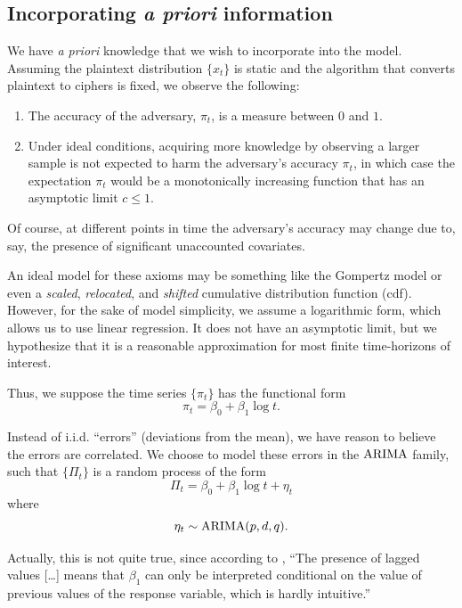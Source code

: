 \documentclass[final,
  11pt,
]{article}
\begin{document}
\hypertarget{incorporating-information}{%
\subsection{\texorpdfstring{Incorporating \emph{a priori}
information}{Incorporating  information}}\label{incorporating-information}}

We have \emph{a priori} knowledge that we wish to incorporate into the
model. Assuming the plaintext distribution \(\{x_t\}\) is static and the
algorithm that converts plaintext to ciphers is fixed, we observe the
following:

\begin{enumerate}
\item The accuracy of the adversary, $\pi_t$, is a measure between $0$ and $1$.
\item Under ideal conditions, acquiring more knowledge by observing a larger
sample is not expected to harm the adversary's accuracy $\pi_t$, in which case
the expectation $\pi_t$ would be a monotonically increasing function that has
an asymptotic limit $c \leq 1$.
\end{enumerate}

Of course, at different points in time the adversary's accuracy may
change due to, say, the presence of significant unaccounted covariates.

An ideal model for these axioms may be something like the Gompertz model
or even a \emph{scaled}, \emph{relocated}, and \emph{shifted} cumulative
distribution function (cdf). However, for the sake of model simplicity,
we assume a logarithmic form, which allows us to use linear regression.
It does not have an asymptotic limit, but we hypothesize that it is a
reasonable approximation for most finite time-horizons of interest.

Thus, we suppose the time series \(\{\pi_t\}\) has the functional form
\[
  \pi_t = \beta_0 + \beta_1 \log t.
\]

Instead of i.i.d. ``errors'' (deviations from the mean), we have reason
to believe the errors are correlated. We choose to model these errors in
the \(\operatorname{ARIMA}\) family, such that \(\{\Pi_t\}\) is a random process of
the form \[
  \Pi_t = \beta_0 + \beta_1 \log t + \eta_t
\] where \[
  \eta_t \sim \operatorname{ARIMA}(p,d,q).
\]

Actually, this is not quite true, since according to \cite{rob_arimax},
``The presence of lagged values {[}\ldots{]} means that \(\beta_1\) can
only be interpreted conditional on the value of previous values of the
response variable, which is hardly intuitive.''
\end{document}
